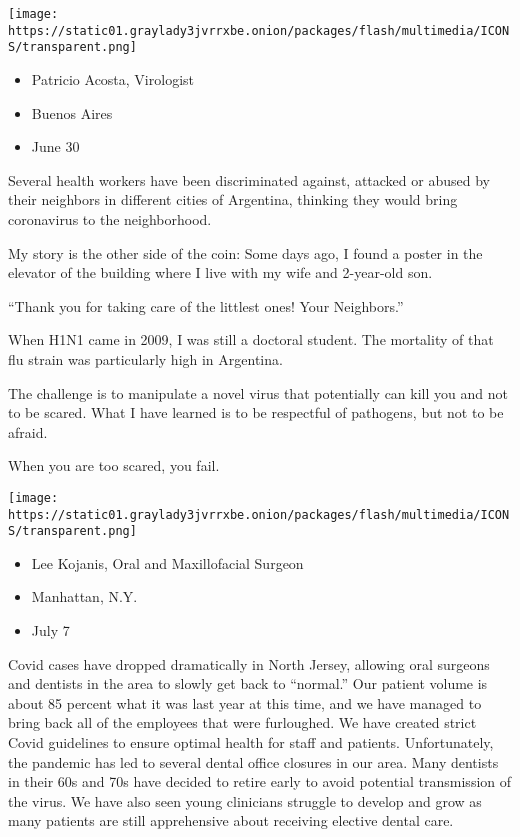\texttt{[image: https://static01.graylady3jvrrxbe.onion/packages/flash/multimedia/ICONS/transparent.png]}

\begin{itemize}
\tightlist
\item
  Patricio Acosta, Virologist
\item
  Buenos Aires
\item
  June 30
\end{itemize}

Several health workers have been discriminated against, attacked or
abused by their neighbors in different cities of Argentina, thinking
they would bring coronavirus to the neighborhood.

My story is the other side of the coin: Some days ago, I found a poster
in the elevator of the building where I live with my wife and 2-year-old
son.

``Thank you for taking care of the littlest ones! Your Neighbors.''

When H1N1 came in 2009, I was still a doctoral student. The mortality of
that flu strain was particularly high in Argentina.

The challenge is to manipulate a novel virus that potentially can kill
you and not to be scared. What I have learned is to be respectful of
pathogens, but not to be afraid.

When you are too scared, you fail.

\texttt{[image: https://static01.graylady3jvrrxbe.onion/packages/flash/multimedia/ICONS/transparent.png]}

\begin{itemize}
\tightlist
\item
  Lee Kojanis, Oral and Maxillofacial Surgeon
\item
  Manhattan, N.Y.
\item
  July 7
\end{itemize}

Covid cases have dropped dramatically in North Jersey, allowing oral
surgeons and dentists in the area to slowly get back to ``normal.'' Our
patient volume is about 85 percent what it was last year at this time,
and we have managed to bring back all of the employees that were
furloughed. We have created strict Covid guidelines to ensure optimal
health for staff and patients. Unfortunately, the pandemic has led to
several dental office closures in our area. Many dentists in their 60s
and 70s have decided to retire early to avoid potential transmission of
the virus. We have also seen young clinicians struggle to develop and
grow as many patients are still apprehensive about receiving elective
dental care.

